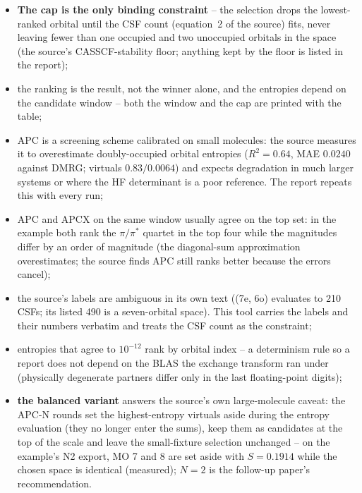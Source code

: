 \begin{readbox}
\begin{itemize}
  \item \textbf{The cap is the only binding constraint} -- the selection drops
    the lowest-ranked orbital until the CSF count (equation~2 of the source)
    fits, never leaving fewer than one occupied and two unoccupied orbitals in
    the space (the source's CASSCF-stability floor; anything kept by the floor
    is listed in the report);
  \item the ranking is the result, not the winner alone, and the entropies
    depend on the candidate window -- both the window and the cap are printed
    with the table;
  \item APC is a screening scheme calibrated on small molecules: the source
    measures it to overestimate doubly-occupied orbital entropies
    ($R^2 = 0.64$, MAE $0.0240$ against DMRG; virtuals $0.83/0.0064$) and
    expects degradation in much larger systems or where the HF determinant is
    a poor reference.  The report repeats this with every run;
  \item APC and APCX on the same window usually agree on the top set: in the
    example both rank the $\pi/\pi^*$ quartet in the top four while the
    magnitudes differ by an order of magnitude (the diagonal-sum
    approximation overestimates; the source finds APC still ranks better
    because the errors cancel);
  \item the source's  labels are ambiguous in its own text
    ((7e, 6o) evaluates to 210 CSFs; its listed 490 is a seven-orbital
    space).  This tool carries the labels and their numbers verbatim and
    treats the CSF count as the constraint;
  \item entropies that agree to $10^{-12}$ rank by orbital index -- a
    determinism rule so a report does not depend on the BLAS the exchange
    transform ran under (physically degenerate partners differ only in the
    last floating-point digits);
  \item \textbf{the balanced variant} answers the source's own large-molecule
    caveat: the APC-N rounds set the highest-entropy virtuals aside during
    the entropy evaluation (they no longer enter the sums), keep them as
    candidates at the top of the scale and leave the small-fixture selection
    unchanged -- on the example's N2 export, MO 7 and 8 are set aside with
    $S = 0.1914$ while the chosen space is identical (measured); $N = 2$ is
    the follow-up paper's recommendation.
\end{itemize}
\end{readbox}

